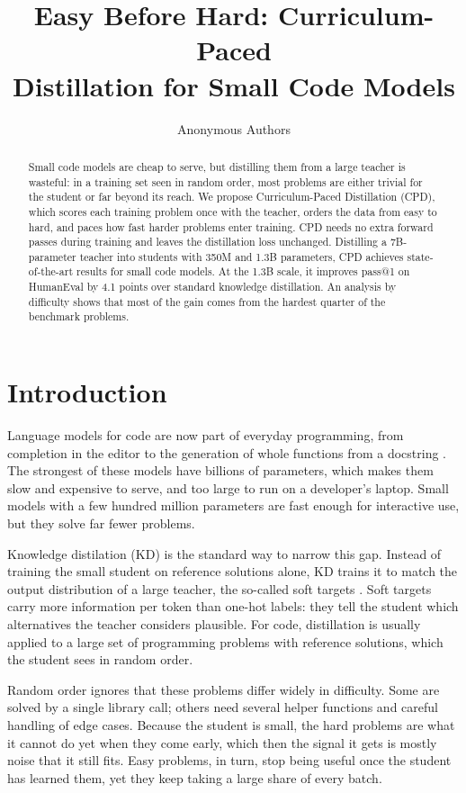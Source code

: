\documentclass{article} %
\title{Easy Before Hard: Curriculum-Paced \\ Distillation for Small Code Models}
\author{Anonymous Authors}
\begin{document}
\maketitle

\begin{abstract}
Small code models are cheap to serve, but distilling them from a large teacher is wasteful: in a training set seen in random order, most problems are either trivial for the student or far beyond its reach.
We propose Curriculum-Paced Distillation (CPD), which scores each training problem once with the teacher, orders the data from easy to hard, and paces how fast harder problems enter training.
CPD needs no extra forward passes during training and leaves the distillation loss unchanged.
Distilling a 7B-parameter teacher into students with 350M and 1.3B parameters, CPD achieves state-of-the-art results for small code models.
At the 1.3B scale, it improves pass@1 on HumanEval by 4.1 points over standard knowledge distillation.
An analysis by difficulty shows that most of the gain comes from the hardest quarter of the benchmark problems.
\end{abstract}

\section{Introduction}
\label{sec:intro}

Language models for code are now part of everyday programming, from completion in the editor to the generation of whole functions from a docstring \citep{chen2021evaluating,roziere2023code}.
The strongest of these models have billions of parameters, which makes them slow and expensive to serve, and too large to run on a developer's laptop.
Small models with a few hundred million parameters are fast enough for interactive use, but they solve far fewer problems.

Knowledge distilation (KD) is the standard way to narrow this gap.
Instead of training the small student on reference solutions alone, KD trains it to match the output distribution of a large teacher, the so-called soft targets \citet{hinton2015distilling}.
Soft targets carry more information per token than one-hot labels: they tell the student which alternatives the teacher considers plausible.
For code, distillation is usually applied to a large set of programming problems with reference solutions, which the student sees in random order.

Random order ignores that these problems differ widely in difficulty.
Some are solved by a single library call; others need several helper functions and careful handling of edge cases.
Because the student is small, the hard problems are what it cannot do yet when they come early, which then the signal it gets is mostly noise that it still fits.
Easy problems, in turn, stop being useful once the student has learned them, yet they keep taking a large share of every batch.
\end{document}
